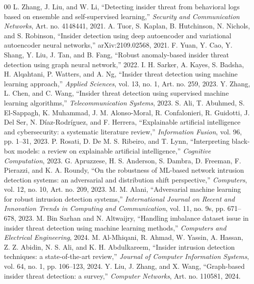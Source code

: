 \documentclass[journal]{IEEEtran}
\begin{document}
\begin{thebibliography}{00}
 L. Zhang, J. Liu, and W. Li, ``Detecting insider threat from behavioral logs based on ensemble and self-supervised learning,'' \emph{Security and Communication Networks}, Art. no. 4148441, 2021.
 A. Tuor, S. Kaplan, B. Hutchinson, N. Nichols, and S. Robinson, ``Insider detection using deep autoencoder and variational autoencoder neural networks,'' arXiv:2109.02568, 2021.
 F. Yuan, Y. Cao, Y. Shang, Y. Liu, J. Tan, and B. Fang, ``Robust anomaly-based insider threat detection using graph neural network,'' 2022.
 I. H. Sarker, A. Kayes, S. Badsha, H. Alqahtani, P. Watters, and A. Ng, ``Insider threat detection using machine learning approach,'' \emph{Applied Sciences}, vol. 13, no. 1, Art. no. 259, 2023.
 Y. Zhang, L. Chen, and C. Wang, ``Insider threat detection using supervised machine learning algorithms,'' \emph{Telecommunication Systems}, 2023.
 S. Ali, T. Abuhmed, S. El-Sappagh, K. Muhammad, J. M. Alonso-Moral, R. Confalonieri, R. Guidotti, J. Del Ser, N. Díaz-Rodríguez, and F. Herrera, ``Explainable artificial intelligence and cybersecurity: a systematic literature review,'' \emph{Information Fusion}, vol. 96, pp. 1--31, 2023.
 P. Rosati, D. De M. S. Ribeiro, and T. Lynn, ``Interpreting black-box models: a review on explainable artificial intelligence,'' \emph{Cognitive Computation}, 2023.
 G. Apruzzese, H. S. Anderson, S. Dambra, D. Freeman, F. Pierazzi, and K. A. Roundy, ``On the robustness of ML-based network intrusion detection systems: an adversarial and distribution shift perspective,'' \emph{Computers}, vol. 12, no. 10, Art. no. 209, 2023.
 M. M. Alani, ``Adversarial machine learning for robust intrusion detection systems,'' \emph{International Journal on Recent and Innovation Trends in Computing and Communication}, vol. 11, no. 9s, pp. 671--678, 2023.
 M. Bin Sarhan and N. Altwaijry, ``Handling imbalance dataset issue in insider threat detection using machine learning methods,'' \emph{Computers and Electrical Engineering}, 2024.
 M. Al-Mhiqani, R. Ahmad, W. Yassin, A. Hassan, Z. Z. Abidin, N. S. Ali, and K. H. Abdulkareem, ``Insider intrusion detection techniques: a state-of-the-art review,'' \emph{Journal of Computer Information Systems}, vol. 64, no. 1, pp. 106--123, 2024.
 Y. Liu, J. Zhang, and X. Wang, ``Graph-based insider threat detection: a survey,'' \emph{Computer Networks}, Art. no. 110581, 2024.

\end{thebibliography}
\end{document}
